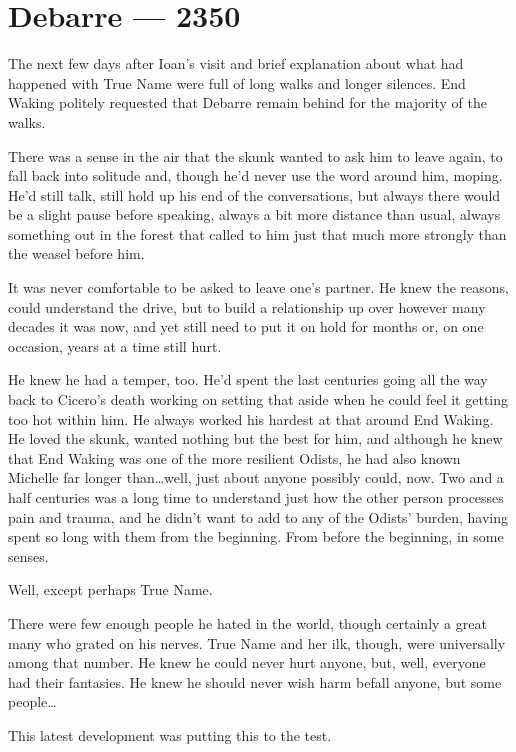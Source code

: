 \hypertarget{debarre-2350}{%
\chapter{Debarre — 2350}\label{debarre-2350}}

The next few days after Ioan's visit and brief explanation about what had happened with True Name were full of long walks and longer silences. End Waking politely requested that Debarre remain behind for the majority of the walks.

There was a sense in the air that the skunk wanted to ask him to leave again, to fall back into solitude and, though he'd never use the word around him, moping. He'd still talk, still hold up his end of the conversations, but always there would be a slight pause before speaking, always a bit more distance than usual, always something out in the forest that called to him just that much more strongly than the weasel before him.

It was never comfortable to be asked to leave one's partner. He knew the reasons, could understand the drive, but to build a relationship up over however many decades it was now, and yet still need to put it on hold for months or, on one occasion, years at a time still hurt.

He knew he had a temper, too. He'd spent the last centuries going all the way back to Cicero's death working on setting that aside when he could feel it getting too hot within him. He always worked his hardest at that around End Waking. He loved the skunk, wanted nothing but the best for him, and although he knew that End Waking was one of the more resilient Odists, he had also known Michelle far longer than\ldots well, just about anyone possibly could, now. Two and a half centuries was a long time to understand just how the other person processes pain and trauma, and he didn't want to add to any of the Odists' burden, having spent so long with them from the beginning. From before the beginning, in some senses.

Well, except perhaps True Name.

There were few enough people he hated in the world, though certainly a great many who grated on his nerves. True Name and her ilk, though, were universally among that number. He knew he could never hurt anyone, but, well, everyone had their fantasies. He knew he should never wish harm befall anyone, but some people\ldots{}

This latest development was putting this to the test.


